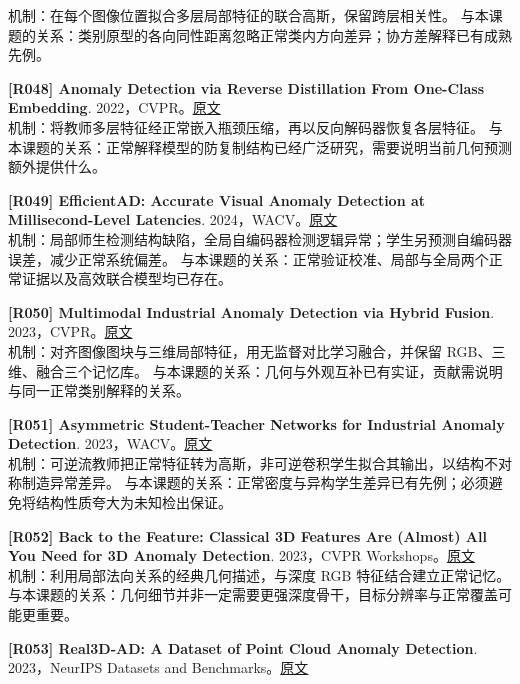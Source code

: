 \documentclass[11pt,a4paper]{article}
\begin{document}
机制：在每个图像位置拟合多层局部特征的联合高斯，保留跨层相关性。 与本课题的关系：类别原型的各向同性距离忽略正常类内方向差异；协方差解释已有成熟先例。\par\medskip
\hypertarget{R048}{}\textbf{[R048] Anomaly Detection via Reverse Distillation From One-Class Embedding}. 2022，CVPR。\href{https://arxiv.org/pdf/2201.10703}{原文}\\
机制：将教师多层特征经正常嵌入瓶颈压缩，再以反向解码器恢复各层特征。 与本课题的关系：正常解释模型的防复制结构已经广泛研究，需要说明当前几何预测额外提供什么。\par\medskip
\hypertarget{R049}{}\textbf{[R049] EfficientAD: Accurate Visual Anomaly Detection at Millisecond-Level Latencies}. 2024，WACV。\href{https://arxiv.org/pdf/2303.14535}{原文}\\
机制：局部师生检测结构缺陷，全局自编码器检测逻辑异常；学生另预测自编码器误差，减少正常系统偏差。 与本课题的关系：正常验证校准、局部与全局两个正常证据以及高效联合模型均已存在。\par\medskip
\hypertarget{R050}{}\textbf{[R050] Multimodal Industrial Anomaly Detection via Hybrid Fusion}. 2023，CVPR。\href{https://arxiv.org/pdf/2303.00601}{原文}\\
机制：对齐图像图块与三维局部特征，用无监督对比学习融合，并保留 RGB、三维、融合三个记忆库。 与本课题的关系：几何与外观互补已有实证，贡献需说明与同一正常类别解释的关系。\par\medskip
\hypertarget{R051}{}\textbf{[R051] Asymmetric Student-Teacher Networks for Industrial Anomaly Detection}. 2023，WACV。\href{https://openaccess.thecvf.com/content/WACV2023/papers/Rudolph_Asymmetric_Student-Teacher_Networks_for_Industrial_Anomaly_Detection_WACV_2023_paper.pdf}{原文}\\
机制：可逆流教师把正常特征转为高斯，非可逆卷积学生拟合其输出，以结构不对称制造异常差异。 与本课题的关系：正常密度与异构学生差异已有先例；必须避免将结构性质夸大为未知检出保证。\par\medskip
\hypertarget{R052}{}\textbf{[R052] Back to the Feature: Classical 3D Features Are (Almost) All You Need for 3D Anomaly Detection}. 2023，CVPR Workshops。\href{https://arxiv.org/pdf/2203.05550}{原文}\\
机制：利用局部法向关系的经典几何描述，与深度 RGB 特征结合建立正常记忆。 与本课题的关系：几何细节并非一定需要更强深度骨干，目标分辨率与正常覆盖可能更重要。\par\medskip
\hypertarget{R053}{}\textbf{[R053] Real3D-AD: A Dataset of Point Cloud Anomaly Detection}. 2023，NeurIPS Datasets and Benchmarks。\href{https://arxiv.org/pdf/2309.13226}{原文}\\
\end{document}
